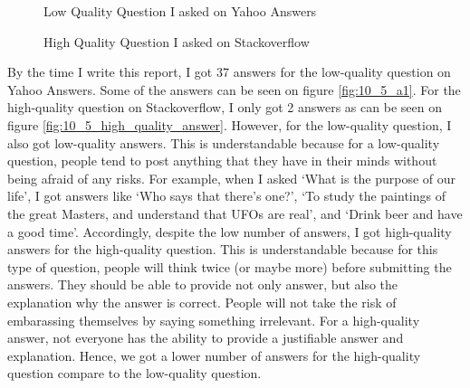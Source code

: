 \documentclass[letterpaper,11pt]{article}
\begin{document}
\begin{figure}[H]
	\centering
	\caption{Low Quality Question I asked on Yahoo Answers}
	\label{fig:10_5_q}
\end{figure}

\begin{figure}[H]
	\centering
	\caption{High Quality Question I asked on Stackoverflow}
	\label{fig:10_5_hi_quality}
\end{figure}

By the time I write this report, I got 37 answers for the low-quality question on Yahoo Answers. Some of the answers can be seen on figure \ref{fig:10_5_a1}. For the high-quality question on Stackoverflow, I only got 2 answers as can be seen on figure \ref{fig:10_5_high_quality_answer}. \newline 
However, for the low-quality question, I also got low-quality answers. This is understandable because for a low-quality question, people tend to post anything that they have in their minds without being afraid of any risks. For example, when I asked `What is the purpose of our life', I got answers like `Who says that there's one?', `To study the paintings of the great Masters, and understand that UFOs are real', and `Drink beer and have a good time'. \newline
Accordingly, despite the low number of answers, I got high-quality answers for the high-quality question. This is understandable because for this type of question, people will think twice (or maybe more) before submitting the answers. They should be able to provide not only answer, but also the explanation why the answer is correct. People will not take the risk of embarassing themselves by saying something irrelevant. For a high-quality answer, not everyone has the ability to provide a justifiable answer and explanation. Hence, we got a lower number of answers for the high-quality question compare to the low-quality question. 
\end{document}
